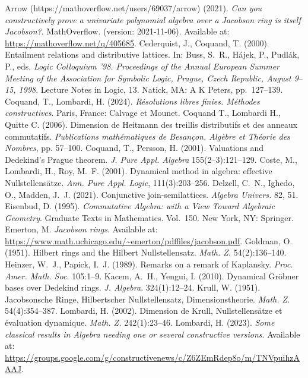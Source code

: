 \documentclass[11pt]{article}
\theoremstyle{definition}
\begin{document}
\begin{thebibliography}{99}
 Arrow (https://mathoverflow.net/users/69037/arrow) (2021). \emph{Can you constructively prove a univariate polynomial algebra over a Jacobson ring is itself Jacobson?}. MathOverflow. (version: 2021-11-06). Available at: \url{https://mathoverflow.net/q/405685}.
 Cederquist, J., Coquand, T. (2000). Entailment relations and distributive lattices. In: Buss, S.~R., Hájek, P., Pudlák, P., eds. \emph{Logic Colloquium ’98. Proceedings of the Annual European Summer Meeting of the Association for Symbolic Logic, Prague, Czech Republic, August 9–15, 1998}. Lecture Notes in Logic, 13. Natick, MA: A K Peters, pp.~127--139.
 Coquand, T., Lombardi, H. (2024). \emph{Résolutions libres finies. Méthodes constructives}. Paris, France: Calvage et Mounet.
 Coquand T., Lombardi H., Quitte C. (2006). Dimension de Heitmann des treillis distributifs et des anneaux commutatifs. \emph{Publications mathématiques de Besançon. Algèbre et Théorie des Nombres}, pp. 57--100.
 Coquand, T., Persson, H. (2001). Valuations and Dedekind’s Prague theorem. \emph{J. Pure Appl. Algebra} 155(2--3):121--129. 
 Coste, M., Lombardi, H., Roy, M.~F. (2001). Dynamical method in algebra: effective Nullstellens\"atze. \emph{Ann. Pure Appl. Logic}, 111(3):203--256.
 Delzell, C.~N., Ighedo, O., Madden, J.~J. (2021). Conjunctive join-semilattices. \emph{Algebra Univers.} 82, 51.
 Eisenbud, D. (1995). \emph{Commutative Algebra: with a View Toward Algebraic Geometry}. Graduate Texts in Mathematics. Vol.~150. New York, NY: Springer.
 Emerton, M. \emph{Jacobson rings}. Available at: \url{https://www.math.uchicago.edu/~emerton/pdffiles/jacobson.pdf}.
 Goldman, O. (1951). Hilbert rings and the Hilbert Nullstellensatz. \emph{Math. Z.} 54(2):136--140.
 Heinzer, W.~J., Papick, I.~J. (1989). Remarks on a remark of Kaplansky. \emph{Proc. Amer. Math. Soc.} 105:1--9.
 Kacem, A.~H., Yengui, I. (2010). Dynamical Gröbner bases over Dedekind rings. \emph{J. Algebra}. 324(1):12--24.
 Krull, W. (1951). Jacobsonsche Ringe, Hilbertscher Nullstellensatz, Dimensionstheorie. \emph{Math. Z.} 54(4):354--387.
 Lombardi, H. (2002). Dimension de Krull, Nullstellens\"atze et évaluation dynamique. \emph{Math. Z.} 242(1):23--46.
 Lombardi, H. (2023). \emph{Some classical results in Algebra needing one or several constructive versions}. Available at: \url{https://groups.google.com/g/constructivenews/c/Z6ZEmRdep8o/m/TNVpuihzAAAJ}.

\end{thebibliography}
\end{document}
